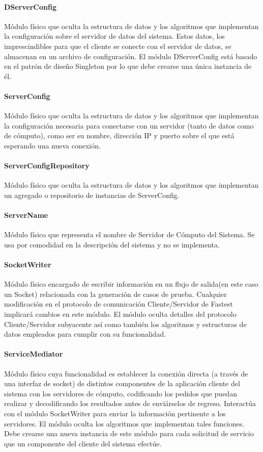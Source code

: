 \documentclass[a4paper,10pt]{report}
\begin{document}
				\paragraph{DServerConfig}
				Módulo físico que oculta la estructura de datos y los algoritmos que implementan la configuración sobre el servidor de datos del sistema. Estos datos, los imprescindibles para que el cliente se conecte con el servidor de datos, se almacenan en un archivo de configuración. El módulo DServerConfig está basado en el patrón de diseño Singleton por lo que debe crearse una única instancia de él.
				\paragraph{ServerConfig}
				Módulo físico que oculta la estructura de datos y los algoritmos que implementan la configuración necesaria para conectarse con un servidor (tanto de datos como de cómputo), como ser su nombre, dirección IP y puerto sobre el que está esperando una nueva conexión.
				\paragraph{ServerConfigRepository}
				Módulo físico que oculta la estructura de datos y los algoritmos que implementan un agregado o repositorio de instancias de ServerConfig.
				\paragraph{ServerName}
				Módulo físico que representa el nombre de Servidor de Cómputo del Sistema. Se usa por comodidad en la descripción del sistema y no se implementa.
				\paragraph{SocketWriter}
				Módulo físico encargado de escribir información en un flujo de salida(en este caso un Socket) relacionada con la generación de casos de prueba. Cualquier modificación en el protocolo de comunicación Cliente/Servidor de Fastest implicará cambios en este módulo. El módulo oculta detalles del protocolo Cliente/Servidor subyacente así como también los algoritmos y estructuras de datos empleados para cumplir con su funcionalidad. 
				\paragraph{ServiceMediator}
				Módulo físico cuya funcionalidad es establecer la conexión directa (a través de una interfaz de socket) de distintos componentes de la aplicación cliente del sistema con los servidores de cómputo, codificando los pedidos que puedan realizar y decodificando los resultados antes de enviárselos de regreso. Interactúa con el módulo SocketWriter para enviar la información pertinente a los servidores. El módulo oculta los algoritmos que implementan tales funciones. Debe crearse una nueva instancia de este módulo para cada solicitud de servicio que un componente del cliente del sistema efectúe.
\end{document}
